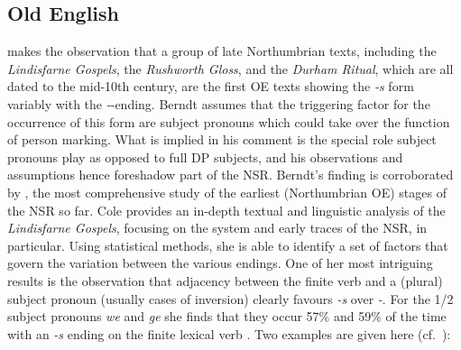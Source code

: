 \documentclass[output=paper]{langsci/langscibook}
\begin{document}
\begin{table}
\caption{Historical development of verbal inflection, Northern
varieties\label{tab:trips:10.2}}
\end{table}

\subsection{Old English}
\label{sec:oe}

\citet{Berndt1956} makes the observation that a group of late Northumbrian
texts, including the \emph{Lindisfarne Gospels}, the \emph{Rushworth Gloss}, and
the \emph{Durham Ritual}, which are all dated to the mid-10th century, are the
first \gls{OE} texts showing the \emph{-s} form variably with the
\emph{-\dh}-ending. Berndt assumes that the triggering factor for the
occurrence of this form are subject pronouns which could take over the function
of person marking. What is implied in his comment is the special role subject
pronouns play as opposed to full DP subjects, and his observations and
assumptions hence foreshadow part of the \gls{NSR}. Berndt's finding is
corroborated by \textcite{Cole2014}, the most comprehensive study of the
earliest (Northumbrian \gls{OE}) stages of the \gls{NSR} so far. Cole provides
an in-depth textual and linguistic analysis of the \emph{Lindisfarne Gospels},
focusing on the  system and early traces of the \gls{NSR}, in
particular. Using statistical methods, she is able to identify a set of factors
that govern the variation between the various  endings. One of her
most intriguing results is the observation that adjacency between the finite
verb and a (plural) subject pronoun (usually cases of inversion) clearly
favours \emph{-s} over \emph{-\dh}. For the 1/2\Pl{} subject pronouns \emph{we}
and \emph{ge} she finds that they occur 57\% and 59\% of the time with an
\emph{-s} ending on the finite lexical verb \parencite[112]{Cole2014}. Two
examples are given here (cf.\ \citealt[93]{Cole2014}):
\end{document}
